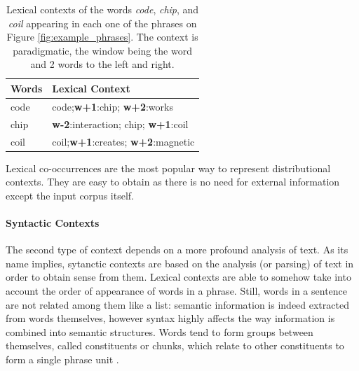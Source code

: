 \begin{table}[]
\centering
\caption{Lexical contexts of the words \textit{code}, \textit{chip}, and \textit{coil} appearing in each one of the phrases on Figure \ref{fig:example_phrases}. The context is paradigmatic, the window being the word and 2 words to the left and right.}
\label{tab:exo_lexical_contxt}
\begin{tabular}{@{}ll@{}}
\toprule
Words & Lexical Context                        \\ \midrule
code  & code;\textbf{w+1}:chip; \textbf{w+2}:works                    \\
chip  & \textbf{w-2}:interaction; chip; \textbf{w+1}:coil \\
coil  & coil;\textbf{w+1}:creates; \textbf{w+2}:magnetic              \\ \bottomrule
\end{tabular}
\end{table}

Lexical co-occurrences are the most popular way to represent distributional contexts. They are easy to obtain as there is no need for external information except the input corpus itself. 
 




%
\paragraph{Syntactic Contexts}

The second type of context depends on a more profound analysis of text. As its name implies, sytanctic contexts are based on the analysis (or parsing) of text in order to obtain sense from them. Lexical contexts are able to somehow take into account the order of appearance of words in a phrase. Still, words in a sentence are not related among them like a list: semantic information is indeed extracted from words themselves, however syntax highly affects the way information is combined into semantic structures. Words tend to form groups between themselves, called constituents or chunks, which relate to other constituents to form a single phrase unit \cite{bender2013linguistic}.


